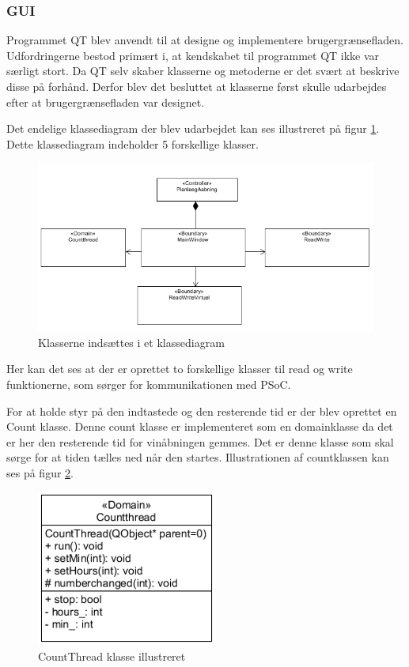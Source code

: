 \subsubsection{GUI}
Programmet QT blev anvendt til at designe og implementere brugergrænsefladen. Udfordringerne bestod primært i, at kendskabet til programmet QT ikke var særligt stort. Da QT selv skaber klasserne og metoderne er det svært at beskrive disse på forhånd. Derfor blev det besluttet at klasserne først skulle udarbejdes efter at brugergrænsefladen var designet.

Det endelige klassediagram der blev udarbejdet kan ses illustreret på figur \ref{kd}. Dette klassediagram indeholder 5 forskellige klasser.

\begin{figure}[H]
	\centerline{\includegraphics[scale=0.6]{tex/Design/GUI/Fotos/Tom_klassediagram_GUI}}
	\caption{Klasserne indsættes i et klassediagram}
	\label{kd}
\end{figure}

Her kan det ses at der er oprettet to forskellige klasser til read og write funktionerne, som sørger for kommunikationen med PSoC.

For at holde styr på den indtastede og den resterende tid er der blev oprettet en Count klasse. Denne count klasse er implementeret som en domainklasse da det er her den resterende tid for vinåbningen gemmes. Det er denne klasse som skal sørge for at tiden tælles ned når den startes. Illustrationen af countklassen kan ses på figur \ref{CT_CD}.

\begin{figure}[H]
	\centerline{\includegraphics[scale=1]{tex/Design/GUI/Fotos/CountThread}}
	\caption{CountThread klasse illustreret}
	\label{CT_CD}
\end{figure}

